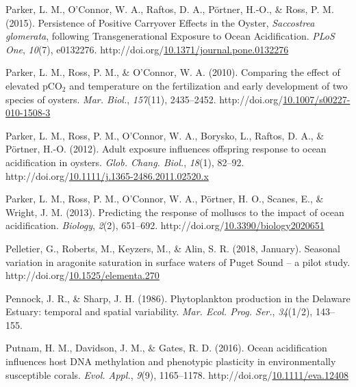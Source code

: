 \documentclass [11pt, proquest] {uwthesis}[2015/03/03]
\newlength{\cslhangindent}
\newenvironment{CSLReferences}%
{\setlength{\parindent}{0pt}%
\everypar{\setlength{\hangindent}{\cslhangindent}}\ignorespaces}%
{\par}
\begin{document}
\begin{CSLReferences}{1}{0}
\leavevmode\hypertarget{ref-Parker2015}{}%
Parker, L. M., O'Connor, W. A., Raftos, D. A., Pörtner, H.-O., \& Ross, P. M. (2015). {Persistence of Positive Carryover Effects in the Oyster, \emph{Saccostrea glomerata}, following Transgenerational Exposure to Ocean Acidification}. \emph{PLoS One}, \emph{10}(7), e0132276. http://doi.org/\href{https://doi.org/10.1371/journal.pone.0132276}{10.1371/journal.pone.0132276}

\leavevmode\hypertarget{ref-Parker2010}{}%
Parker, L. M., Ross, P. M., \& O'Connor, W. A. (2010). {Comparing the effect of elevated {pCO\(_2\)} and temperature on the fertilization and early development of two species of oysters}. \emph{Mar. Biol.}, \emph{157}(11), 2435--2452. http://doi.org/\href{https://doi.org/10.1007/s00227-010-1508-3}{10.1007/s00227-010-1508-3}

\leavevmode\hypertarget{ref-Parker2012}{}%
Parker, L. M., Ross, P. M., O'Connor, W. A., Borysko, L., Raftos, D. A., \& Pörtner, H.-O. (2012). {Adult exposure influences offspring response to ocean acidification in oysters}. \emph{Glob. Chang. Biol.}, \emph{18}(1), 82--92. http://doi.org/\href{https://doi.org/10.1111/j.1365-2486.2011.02520.x}{10.1111/j.1365-2486.2011.02520.x}

\leavevmode\hypertarget{ref-Parker2013}{}%
Parker, L. M., Ross, P. M., O'Connor, W. A., Pörtner, H. O., Scanes, E., \& Wright, J. M. (2013). {Predicting the response of molluscs to the impact of ocean acidification}. \emph{Biology}, \emph{2}(2), 651--692. http://doi.org/\href{https://doi.org/10.3390/biology2020651}{10.3390/biology2020651}

\leavevmode\hypertarget{ref-Pelletier2018}{}%
Pelletier, G., Roberts, M., Keyzers, M., \& Alin, S. R. (2018, January). {Seasonal variation in aragonite saturation in surface waters of Puget Sound -- a pilot study}. http://doi.org/\href{https://doi.org/10.1525/elementa.270}{10.1525/elementa.270}

\leavevmode\hypertarget{ref-Pennock1986}{}%
Pennock, J. R., \& Sharp, J. H. (1986). {Phytoplankton production in the Delaware Estuary: temporal and spatial variability}. \emph{Mar. Ecol. Prog. Ser.}, \emph{34}(1/2), 143--155.

\leavevmode\hypertarget{ref-Putnam2016}{}%
Putnam, H. M., Davidson, J. M., \& Gates, R. D. (2016). {Ocean acidification influences host DNA methylation and phenotypic plasticity in environmentally susceptible corals}. \emph{Evol. Appl.}, \emph{9}(9), 1165--1178. http://doi.org/\href{https://doi.org/10.1111/eva.12408}{10.1111/eva.12408}


\end{CSLReferences}
\end{document}
